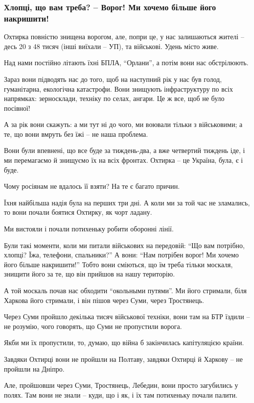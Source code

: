  
 
 
 
 

\subsubsection{Хлопці, що вам треба? – Ворог! Ми хочемо більше його накришити!}

Охтирка повністю знищена ворогом, але, попри це, у нас залишаються жителі –
десь 20 з 48 тисяч (інші виїхали – УП), та військові. Удень місто живе.

Над нами постійно літають їхні БПЛА, \enquote{Орлани}, а потім вони нас
обстрілюють. 

Зараз вони підводять нас до того, щоб на наступний рік у нас був голод,
гуманітарна, екологічна катастрофи. Вони знищують інфраструктуру по всіх
напрямках: зерносклади, техніку по селах, ангари. Це ж все, щоб не було
посівної!

А за рік вони скажуть: а ми тут ні до чого, ми воювали тільки з військовими; а
те, що вони вмруть без їжі – не наша проблема. 

Вони були впевнені, що все буде за тиждень-два, а вже четвертий тиждень іде, і
ми перемагаємо й знищуємо їх на всіх фронтах. Охтирка – це Україна, була, є і
буде.


Чому росіянам не вдалось її взяти? На те є багато причин.

Їхня найбільша надія була на перших три дні. А коли ми за той час не зламались,
то вони почали боятися Охтирку, як чорт ладану. 

Ми вистояли і почали потихеньку робити оборонні лінії. 

Були такі моменти, коли ми питали військових на передовій: \enquote{Що вам
потрібно, хлопці? Їжа, телефони, спальники?} А вони: \enquote{Нам потрібен
ворог! Ми хочемо його більше накришити!} Тобто вони сміються, що їм треба
тільки москаля, знищити його за те, що він прийшов на нашу територію. 

А той москаль почав нас обходити \enquote{окольными путями}. Ми його стримали,
біля Харкова його стримали, і він пішов через Суми, через Тростянець. 

Через Суми пройшло декілька тисяч військової техніки, вони там на БТР їздили –
не розумію, чого говорять, що Суми не пропустили ворога.

Якби ми їх пропустили, то, думаю, що війна б закінчилась капітуляцією країни. 

Завдяки Охтирці вони не пройшли на Полтаву, завдяки Охтирці й Харкову – не
пройшли на Дніпро.

Але, пройшовши через Суми, Тростянець, Лебедин, вони просто загубились у полях.
Там вони не знали – куди, що і як, і їх там потихеньку почали палити.
